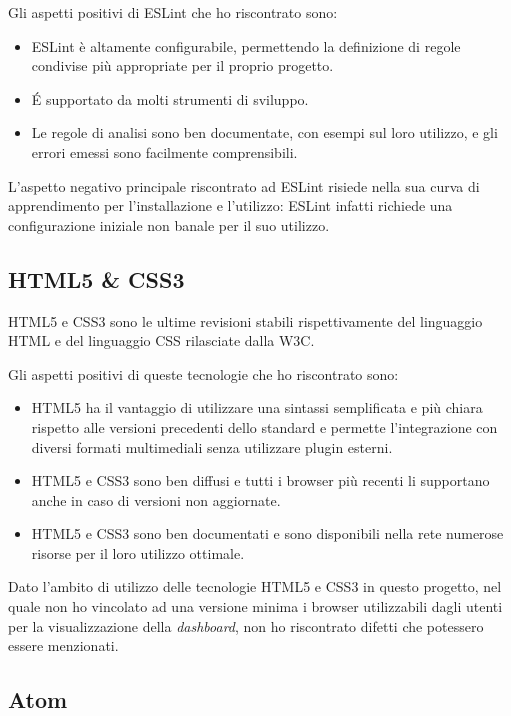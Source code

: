 Gli aspetti positivi di ESLint che ho riscontrato sono:
\begin{itemize}
	\item ESLint è altamente configurabile, permettendo la definizione di regole condivise più appropriate per il proprio progetto.
	\item É supportato da molti strumenti di sviluppo.
	\item Le regole di analisi sono ben documentate, con esempi sul loro utilizzo, e gli errori emessi sono facilmente comprensibili.
\end{itemize}

L'aspetto negativo principale riscontrato ad ESLint risiede nella sua curva di apprendimento per l'installazione e l'utilizzo: ESLint infatti richiede una configurazione iniziale non banale per il suo utilizzo.

\subsection{HTML5 & CSS3}

HTML5 e CSS3 sono le ultime revisioni stabili rispettivamente del linguaggio HTML e del linguaggio CSS rilasciate dalla W3C.

Gli aspetti positivi di queste tecnologie che ho riscontrato sono:
\begin{itemize}
	\item HTML5 ha il vantaggio di utilizzare una sintassi semplificata e più chiara rispetto alle versioni precedenti dello standard e permette l’integrazione con diversi formati multimediali senza utilizzare plugin esterni.
	\item HTML5 e CSS3 sono ben diffusi e tutti i browser più recenti li supportano anche in caso di versioni non aggiornate.
	\item HTML5 e CSS3 sono ben documentati e sono disponibili nella rete numerose risorse per il loro utilizzo ottimale.
\end{itemize}

Dato l'ambito di utilizzo delle tecnologie HTML5 e CSS3 in questo progetto, nel quale non ho vincolato ad una versione minima i browser utilizzabili dagli utenti per la visualizzazione della \emph{dashboard}, non ho riscontrato difetti che potessero essere menzionati.

\subsection{Atom}
\label{subsec:atom}

